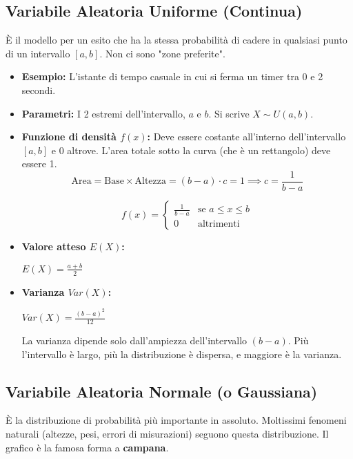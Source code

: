\documentclass[a4paper, 11pt]{article}
\theoremstyle{definition}
\begin{document}
\subsection{Variabile Aleatoria Uniforme (Continua)}
È il modello per un esito che ha la stessa probabilità di cadere in qualsiasi punto di un intervallo $[a, b]$. Non ci sono "zone preferite".
\begin{itemize}
    \item \textbf{Esempio:} L'istante di tempo casuale in cui si ferma un timer tra 0 e 2 secondi.
    \item \textbf{Parametri:} I 2 estremi dell'intervallo, $a$ e $b$. Si scrive $X \sim U(a,b)$.

    \item \textbf{Funzione di densità $f(x)$:}
    Deve essere costante all'interno dell'intervallo $[a, b]$ e 0 altrove.
    L'area totale sotto la curva (che è un rettangolo) deve essere 1.
    \[ \text{Area} = \text{Base} \times \text{Altezza} = (b-a) \cdot c = 1 \implies c = \frac{1}{b-a} \]
    \begin{formulabox}
    \[ f(x) =
        \begin{cases}
        \frac{1}{b-a} & \text{se } a \le x \le b \\
        0 & \text{altrimenti}
        \end{cases}
    \]
    \end{formulabox}

    \item \textbf{Valore atteso $E(X)$:}
    \begin{formulabox}
        $E(X) = \frac{a+b}{2}$
    \end{formulabox}

    \item \textbf{Varianza $Var(X)$:}
    \begin{formulabox}
        $Var(X) = \frac{(b-a)^2}{12}$
    \end{formulabox}
    La varianza dipende solo dall'ampiezza dell'intervallo $(b-a)$. Più l'intervallo è largo, più la distribuzione è dispersa, e maggiore è la varianza.
\end{itemize}

\subsection{Variabile Aleatoria Normale (o Gaussiana)}
È la distribuzione di probabilità più importante in assoluto. Moltissimi fenomeni naturali (altezze, pesi, errori di misurazioni) seguono questa distribuzione. Il grafico è la famosa forma a \textbf{campana}.
\begin{center}
\end{center}
\end{document}
